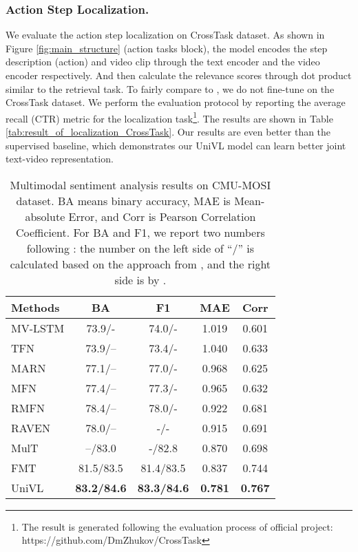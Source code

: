 \documentclass[11pt,a4paper]{article}
\begin{document}
	\subsubsection{Action Step Localization.} 
	We evaluate the action step localization on CrossTask dataset. As shown in Figure \ref{fig:main_structure} (action tasks block), the model encodes the step description (action) and video clip through the text encoder and the video encoder respectively. And then calculate the relevance scores through dot product similar to the retrieval task. To fairly compare to \cite{miech2019howto100m,miech19endtoend,Zhu_2020_CVPR}, we do not fine-tune on the CrossTask dataset. We perform the evaluation protocol by reporting the average recall (CTR) metric for the localization task\footnote{The result is generated following the evaluation process of official project: https://github.com/DmZhukov/CrossTask}. The results are shown in Table \ref{tab:result_of_localization_CrossTask}. Our results are even better than the supervised baseline, which demonstrates our UniVL model can learn better joint text-video representation.
	\begin{table*}[tp] 
		\setlength{\tabcolsep}{4pt}
		\centering
		\begin{tabular}{lcccc}
			\toprule
			Methods         & BA & F1 & MAE & Corr \\ \midrule
			MV-LSTM \cite{Rajagopalan2016Extending} & 73.9/- & 74.0/- & 1.019 &  0.601   \\
			TFN \cite{Zadeh2017Tensor} & 73.9/– & 73.4/- & 1.040 & 0.633    \\
			MARN \cite{zadeh2018multi} & 77.1/– & 77.0/- & 0.968 & 0.625    \\
			MFN \cite{zadeh2018memory} & 77.4/– & 77.3/-  & 0.965 & 0.632    \\
			RMFN \cite{Liang2018Multimodal} & 78.4/– & 78.0/- & 0.922 & 0.681    \\
			RAVEN \cite{Wang2019Words} & 78.0/– & -/- & 0.915 & 0.691    \\
			MulT \cite{Tsai2019Multimodal} & –/83.0 & -/82.8 & 0.870 & 0.698    \\
			FMT \cite{Zadeh2019Factorized} & 81.5/83.5 & 81.4/83.5 & 0.837 & 0.744    \\
			\midrule
			UniVL   & \textbf{83.2/84.6} & \textbf{83.3/84.6} & \textbf{0.781} & \textbf{0.767} \\
			\bottomrule
		\end{tabular}
		\caption{Multimodal sentiment analysis results on CMU-MOSI dataset. BA means binary accuracy, MAE is Mean-absolute Error, and Corr is Pearson Correlation Coefficient. For BA and F1, we report two numbers following \citet{Zadeh2019Factorized}: the number on the left side of “/” is calculated based on the approach from \citet{zadeh2018multi}, and the right side is by \citet{Tsai2019Multimodal}.}
		\label{tab:result_of_MOSI}
	\end{table*}
	
\end{document}

